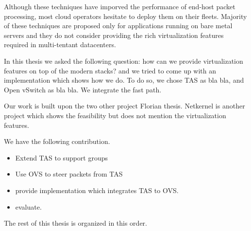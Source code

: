 Although these techniques have imporved the performance of end-host packet processing, most cloud 
operators hesitate to deploy them on their fleets. Majority of these techniques are proposed only for 
applications running on bare metal servers and they do not consider providing the rich 
virtualization features required in multi-tentant datacenters. 

In this thesis we asked the following question: how can we provide virtualization features on 
top of the modern stacks? and we tried to come up with an implementation which shows how we 
do. To do so, we chose TAS as bla bla, and Open vSwitch as bla bla. We integrate the fast path.

Our work is built upon the two other project Florian thesis. Netkernel is another project 
which shows the feasibility but does not mention the virtualization features.


We have the following contribution.
\begin{itemize}
    \item Extend TAS to support groups
    \item Use OVS to steer packets from TAS
    \item provide implementation which integrates TAS to OVS.
    \item evaluate.
\end{itemize}

The rest of this thesis is organized in this order.




